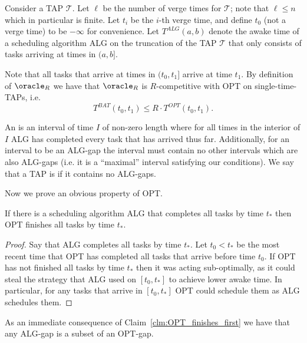 Consider a TAP $\mathcal{T}$. 
Let $\ell$ be the number of verge
times for $\mathcal{T}$; note that $\ell \le n$ which in
particular is finite. Let $t_i$ be the $i$-th verge time, and
define $t_0$ (not a verge time) to be $-\infty$ for convenience.
Let $T^{ALG}(a, b)$ denote the awake time of a scheduling algorithm
ALG on the truncation of the TAP $\mathcal{T}$ that only consists
of tasks arriving at times in $(a, b]$.

Note that all tasks that arrive at times in $(t_0, t_1]$ arrive
at time $t_1$. By definition of $\oracle_R$ we have that
$\oracle_R$ is $R$-competitive with OPT on single-time-TAPs, i.e.
\begin{equation}
  \label{eq:same_single}
  T^{BAT}(t_0,t_1) \le R \cdot T^{OPT}(t_0,t_1).
\end{equation}

An  is an interval of time $I$ of non-zero length where for
all times in the interior of $I$ ALG has completed every
task that has arrived thus far. Additionally, for an interval to
be an ALG-gap the interval must contain no other intervals which
are also ALG-gaps (i.e. it is a \enquote{maximal} interval
satisfying our conditions).
We say that a TAP is  if it contains no ALG-gaps.

Now we prove an obvious property of OPT.
\begin{claim}
  \label{clm:OPT_finishes_first}
  If there is a scheduling algorithm ALG that completes all tasks by
  time $t_*$ then OPT finishes all tasks by time $t_*$.
\end{claim}
\begin{proof}
  Say that ALG completes all tasks by time $t_*$. Let $t_0 < t_*$
  be the most recent time that OPT has completed all tasks that
  arrive before time $t_0$. If OPT has not finished all tasks by
  time $t_*$ then it was acting sub-optimally, as it could steal
  the strategy that ALG used on $[t_0, t_*]$ to achieve lower
  awake time. In particular, for any tasks that arrive in $[t_0,
  t_*]$ OPT could schedule them as ALG schedules them. 
\end{proof}
As an immediate consequence of Claim~\ref{clm:OPT_finishes_first}
we have that any ALG-gap is a subset of an OPT-gap.


